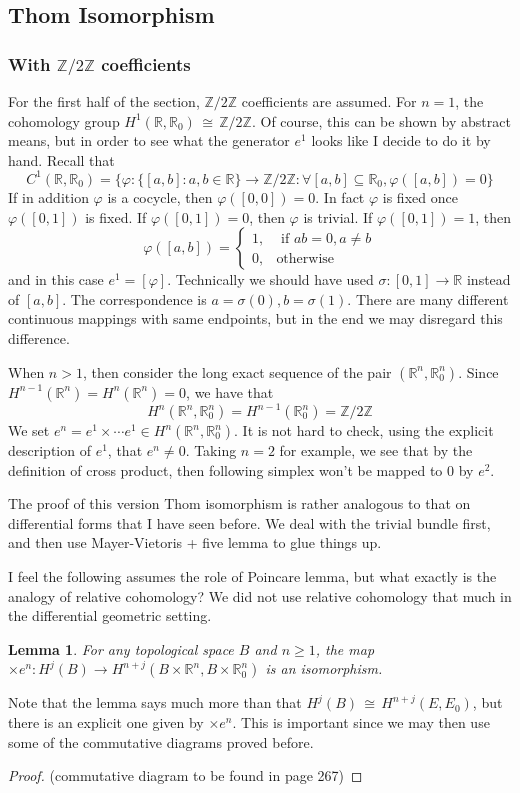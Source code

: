 \documentclass[12pt]{article}
\theoremstyle{plain}
\newtheorem{lemma}[equation]{Lemma}
\theoremstyle{definition}
\newcommand{\IR}{\mathbb{R}}
\newcommand{\IZ}{\mathbb{Z}}
\newcommand\iso{\,{\cong}\,}
\newcommand{\<}{\langle}
\renewcommand{\>}{\rangle}
\begin{document}
\subsection{Thom Isomorphism}
\subsubsection{With $\IZ/2\IZ$ coefficients}
For the first half of the section, $\IZ/2\IZ$ coefficients are assumed.
For $n = 1$, the cohomology group $H^1(\IR, \IR_0) \iso \IZ/2\IZ$. Of course, this can be shown by abstract means, but in order to see what the generator $e^1$ looks like I decide to do it by hand. Recall that $$C^1(\IR, \IR_0)= \{ \varphi : \{ [a, b]: a, b \in \IR \} \to \IZ/2\IZ : \forall [a, b] \subseteq \IR_0, \varphi([a, b]) = 0 \}$$ If in addition $\varphi$ is a cocycle, then $\varphi([0, 0]) = 0$. In fact $\varphi$ is fixed once $\varphi([0, 1])$ is fixed. If $\varphi([0, 1]) = 0$, then $\varphi$ is trivial. If $\varphi([0, 1]) = 1$, then $$ \varphi([a, b]) = \begin{cases} 1, &\text{ if }ab = 0, a \neq b \\
 0,& \text{otherwise} \end{cases} $$ and in this case $e^1 = [\varphi]$. Technically we should have used $\sigma : [0,1] \to \IR$ instead of $[a, b]$. The correspondence is $a = \sigma(0), b = \sigma(1)$. There are many different continuous mappings with same endpoints, but in the end we may disregard this difference. 

When $n > 1$, then consider the long exact sequence of the pair $(\IR^n, \IR^n_0)$. Since $H^{n - 1}(\IR^n) = H^n(\IR^n) = 0$, we have that $$H^n(\IR^n, \IR^n_0) = H^{n - 1}(\IR^n_0) = \IZ / 2\IZ$$ 
We set $e^n = e^1 \times \cdots e^1 \in H^n(\IR^n, \IR^n_0)$. It is not hard to check, using the explicit description of $e^1$, that $e^n \neq 0$. Taking $n = 2$ for example, we see that by the definition of cross product, then following simplex won't be mapped to $0$ by $e^2$. 

The proof of this version Thom isomorphism is rather analogous to that on differential forms that I have seen before. We deal with the trivial bundle first, and then use Mayer-Vietoris + five lemma to glue things up.  

I feel the following assumes the role of Poincare lemma, but what exactly is the analogy of relative cohomology? We did not use relative cohomology that much in the differential geometric setting. 
\begin{lemma}
For any topological space $B$ and $n \ge 1$, the map $\times e^n : H^j(B) \to H^{n + j}(B \times \IR^n, B \times \IR^n_0)$ is an isomorphism. 
\end{lemma}
Note that the lemma says much more than that $H^j(B) \iso H^{n + j}(E, E_0)$, but there is an explicit one given by $\times e^n$. This is important since we may then use some of the commutative diagrams proved before. 
\begin{proof}
(commutative diagram to be found in page 267)
\end{proof}
\end{document}

